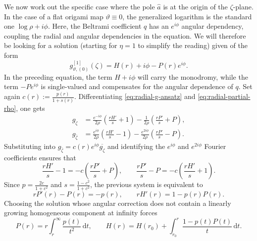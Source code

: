 \documentclass[reqno]{amsart}
\numberwithin{equation}{section}
\theoremstyle{definition}
\theoremstyle{remark}
\providecommand{\dd}{\,\mathrm d}
\begin{document}
We now work out the specific case where the pole $\hat{a}$ is at the origin of the $\zeta$-plane. In the case of a flat origami map $\vartheta\equiv0$, the generalized logarithm is the standard one $\log\rho+i\phi$. Here, the Beltrami coefficient $q$ has an $e^{i\phi}$ angular dependency, coupling the radial and angular dependencies in the equation. We will therefore be looking for a solution (starting for $\eta=1$ to simplify the reading) given of the form
\begin{equation}\label{eq:radial-g-ansatz}
        g^{[1]}_{\vartheta,(0)}(\zeta)=H(r)+i\phi-P(r)e^{i\phi}.
\end{equation}
In the preceding equation, the term $H+i\phi$ will carry the monodromy, while the term $-Pe^{i\phi}$ is single-valued and compensates for the angular dependence of $q$. Set again $c(r):=\frac{p(r)}{1+s(r)}$. Differentiating \eqref{eq:radial-g-ansatz} and \eqref{eq:radial-partial-rho}, one gets
\begin{equation}\label{eq:radial-g-derivatives}
\begin{aligned}
        g_\zeta
        &=\frac{e^{-i\phi}}{2\rho}\left(\frac{rH'}s+1\right)
        -\frac{1}{2\rho}\left(\frac{rP'}s+P\right),\\[1mm]
        g_{\bar\zeta}
        &=\frac{e^{i\phi}}{2\rho}\left(\frac{rH'}s-1\right)
        -\frac{e^{2i\phi}}{2\rho}\left(\frac{rP'}s-P\right).
\end{aligned}
\end{equation}
Substituting into $g_{\bar\zeta}=c(r)e^{i\phi}\overline{g_\zeta}$ and identifying the $e^{i\phi}$ and $e^{2i\phi}$ Fourier coefficients ensures that
\begin{equation}\label{eq:radial-two-equations-c}
        \frac{rH'}s-1=-c\left(\frac{rP'}s+P\right),
        \qquad
        \frac{rP'}s-P=-c\left(\frac{rH'}s+1\right).
\end{equation}
Since $p=\frac{2c}{1+c^2}$ and $s=\frac{1-c^2}{1+c^2}$, the previous system is equivalent to
\begin{equation}\label{eq:radial-odes}
        rP'(r)-P(r)=-p(r),
        \qquad
        rH'(r)=1-p(r)P(r).
\end{equation}
Choosing the solution whose angular correction does not contain a linearly growing homogeneous component at infinity forces
\begin{equation}\label{eq:radial-P-normalization}
        P(r)=r\int_r^\infty \frac{p(t)}{t^2}\dd t,
        \qquad
        H(r)=H(r_0)+\int_{r_0}^{r}\frac{1-p(t)P(t)}{t}\dd t.
\end{equation}
\end{document}
